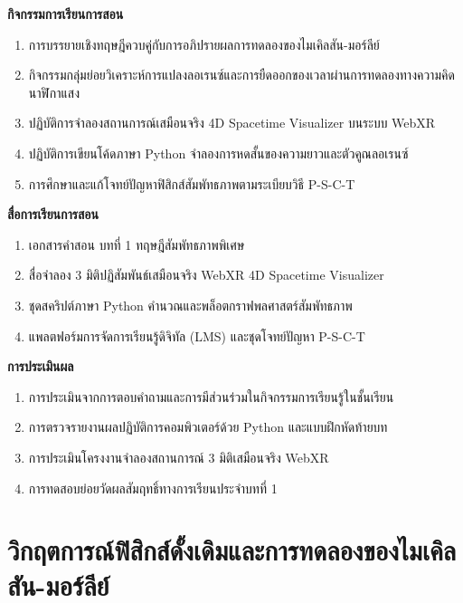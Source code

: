 \begin{lessonplanbox}
\vspace{0.4em}
\noindent\textbf{กิจกรรมการเรียนการสอน}
\begin{enumerate}
    \item การบรรยายเชิงทฤษฎีควบคู่กับการอภิปรายผลการทดลองของไมเคิลสัน-มอร์ลีย์
    \item กิจกรรมกลุ่มย่อยวิเคราะห์การแปลงลอเรนซ์และการยืดออกของเวลาผ่านการทดลองทางความคิดนาฬิกาแสง
    \item ปฏิบัติการจำลองสถานการณ์เสมือนจริง 4D Spacetime Visualizer บนระบบ WebXR
    \item ปฏิบัติการเขียนโค้ดภาษา Python จำลองการหดสั้นของความยาวและตัวคูณลอเรนซ์
    \item การศึกษาและแก้โจทย์ปัญหาฟิสิกส์สัมพัทธภาพตามระเบียบวิธี P-S-C-T
\end{enumerate}

\vspace{0.4em}
\noindent\textbf{สื่อการเรียนการสอน}
\begin{enumerate}
    \item เอกสารคำสอน บทที่ 1 ทฤษฎีสัมพัทธภาพพิเศษ
    \item สื่อจำลอง 3 มิติปฏิสัมพันธ์เสมือนจริง WebXR 4D Spacetime Visualizer
    \item ชุดสคริปต์ภาษา Python คำนวณและพล็อตกราฟพลศาสตร์สัมพัทธภาพ
    \item แพลตฟอร์มการจัดการเรียนรู้ดิจิทัล (LMS) และชุดโจทย์ปัญหา P-S-C-T
\end{enumerate}

\vspace{0.4em}
\noindent\textbf{การประเมินผล}
\begin{enumerate}
    \item การประเมินจากการตอบคำถามและการมีส่วนร่วมในกิจกรรมการเรียนรู้ในชั้นเรียน
    \item การตรวจรายงานผลปฏิบัติการคอมพิวเตอร์ด้วย Python และแบบฝึกหัดท้ายบท
    \item การประเมินโครงงานจำลองสถานการณ์ 3 มิติเสมือนจริง WebXR
    \item การทดสอบย่อยวัดผลสัมฤทธิ์ทางการเรียนประจำบทที่ 1
\end{enumerate}
\end{lessonplanbox}

\newpage

\section{วิกฤตการณ์ฟิสิกส์ดั้งเดิมและการทดลองของไมเคิลสัน-มอร์ลีย์}

